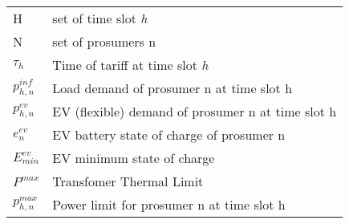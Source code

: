 \begin{table} [!hbt]
    \centering
    \begin{tabular}{ll}
         H& set of time slot \textit{h}\\
         N& set of prosumers n\\
         $\tau_h$& Time of tariff at time slot \textit{h}\\
         $p^{inf}_{h,n}$& Load demand of prosumer n at time slot h\\
         $p^{ev}_{h,n}$& EV (flexible) demand of prosumer n at time slot h\\
         $e^{ev}_{n}$& EV battery state of charge of prosumer n\\
         $E^{ev}_{min}$& EV minimum state of charge\\
         $P^{max}$& Transfomer Thermal Limit\\
 $p^{max}_{h,n}$&Power limit for prosumer n at time slot h\\
    \end{tabular}
    \label{tab:Nomenclature}
\end{table}